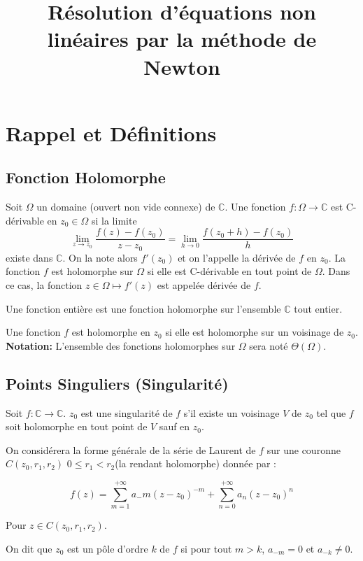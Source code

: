 \documentclass{article}
\begin{document}
\title{Résolution d'équations non linéaires par la méthode de Newton}


\maketitle
\newpage
\tableofcontents
\newpage


\section{Rappel et Définitions}
\subsection{Fonction Holomorphe}
Soit $\Omega$ un domaine (ouvert non vide connexe) de $\mathbb{C}$. Une fonction $f : \Omega \to \mathbb{C}$ est C-dérivable en $z_0 \in \Omega$ si la limite
\[
\lim_{z \to z_0} \frac{f(z) - f(z_0)}{z - z_0} = \lim_{h \to 0} \frac{f(z_0 + h) - f(z_0)}{h}
\]
existe dans $\mathbb{C}$. On la note alors $f'(z_0)$ et on l’appelle la dérivée de $f$ en $z_0$. La fonction $f$ est holomorphe sur $\Omega$ si elle est C-dérivable en tout point de $\Omega$. Dans ce cas, la fonction $z \in \Omega \mapsto f'(z)$ est appelée dérivée de $f$.

Une fonction entière est une fonction holomorphe sur l’ensemble $\mathbb{C}$ tout entier.

Une fonction $f$ est holomorphe en $z_0$ si elle est holomorphe sur un voisinage de $z_0$.\\

\textbf{Notation:}
L’ensemble des fonctions holomorphes sur $\Omega$ sera noté $\Theta(\Omega)$.

\subsection{Points Singuliers (Singularité)}
Soit $f : \mathbb{C} \to \mathbb{C}$. $z_0$ est une singularité de $f$ s'il existe un voisinage $V$ de $z_0$ tel que $f$ soit holomorphe en tout point de $V$ sauf en $z_0$.

On considérera la forme générale de la série de Laurent de $f$ sur une couronne $C(z_0, r_1, r_2)$ $ 0 \leq r_1 < r_2$(la rendant holomorphe)  donnée par :

\[
f(z) = \sum_{m=1}^{+\infty} a_-m (z - z_0)^{-m} + \sum_{n=0}^{+\infty} a_n (z - z_0)^n
\]

Pour $z \in C(z_0, r_1, r_2)$.

On dit que $z_0$ est un pôle d'ordre $k$ de $f$ si pour tout $m > k$, $a_{-m} = 0$ et $a_{-k} \neq 0$.
\end{document}
